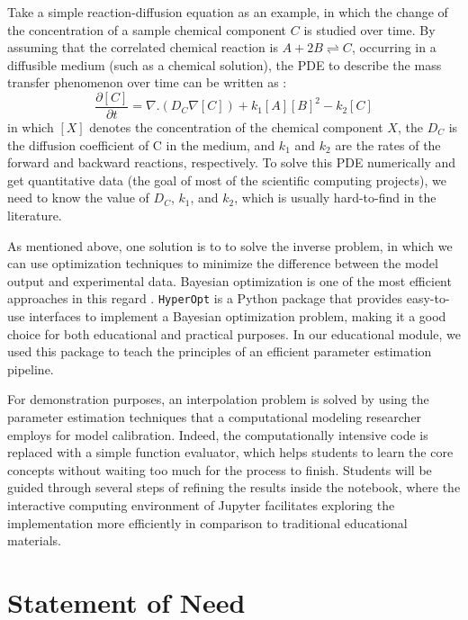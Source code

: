Take a simple reaction-diffusion equation as an example, in which the change of the concentration of a sample chemical component $C$ is studied over time. By assuming that the correlated chemical reaction is $A + 2B \rightleftharpoons C$, occurring in a diffusible medium (such as a chemical solution), the \gls{PDE} to describe the mass transfer phenomenon over time can be written as \cite{Grindrod1996}:
\begin{equation}
\frac{\partial [C]}{\partial t} = \nabla . \left( D_C \nabla [C] \right) + k_1 [A][B]^2 - k_2 [C]
\end{equation}
in which $[X]$ denotes the concentration of the chemical component $X$, the $D_C$ is the diffusion coefficient of C in the medium, and $k_1$ and $k_2$ are the rates of the forward and backward reactions, respectively. To solve this \gls{PDE} numerically and get quantitative data (the goal of most of the scientific computing projects), we need to know the value of $D_C$, $k_1$, and $k_2$, which is usually hard-to-find in the literature.

As mentioned above, one solution is to to solve the inverse problem, in which we can use optimization techniques to minimize the difference between the model output and experimental data. Bayesian optimization is one of the most efficient approaches in this regard \cite{Mockus1989}. \texttt{HyperOpt} \cite{Bergstra2013} is a Python package that provides easy-to-use interfaces to implement a Bayesian optimization problem, making it a good choice for both educational and practical purposes. In our educational module, we used this package to teach the principles of an efficient parameter estimation pipeline.

For demonstration purposes, an interpolation problem is solved by using the parameter estimation techniques that a computational modeling researcher employs for model calibration. Indeed, the computationally intensive code is replaced with a simple function evaluator, which helps students to learn the core concepts without waiting too much for the process to finish. Students will be guided through several steps of refining the results inside the notebook, where the interactive computing environment of Jupyter facilitates exploring the implementation more efficiently in comparison to traditional educational materials.

\section{Statement of Need}

